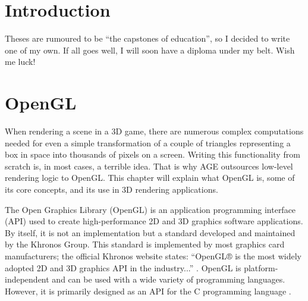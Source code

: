 \documentclass[
  digital,     %
  oneside,     %
  nosansbold,  %
  nocolorbold, %
  lof,         %
  lot,         %
]{fithesis4}
\begin{document}
\setlength{\parskip}{8pt}
\setlength{\parindent}{0pt}

\chapter*{Introduction}

Theses are rumoured to be \enquote{the capstones of education}, so
I decided to write one of my own. If all goes well, I will soon
have a diploma under my belt. Wish me luck!

\chapter{OpenGL}
When rendering a scene in a 3D game, there are numerous complex computations needed for even a simple transformation
of a couple of triangles representing a box in space into thousands of pixels on a screen.
Writing this functionality from scratch is, in most cases, a terrible idea. That is why AGE outsources low-level
rendering logic to OpenGL. This chapter will explain what OpenGL is, some of its core concepts,
and its use in 3D rendering applications.

The Open Graphics Library (OpenGL) is an application programming interface (API) used to create
high-performance 2D and 3D graphics software applications. By itself, it is not an implementation
but a standard developed and maintained by the Khronos Group. This standard is implemented by
most graphics card manufacturers; the official Khronos website states: \enquote{OpenGL® is the most widely
adopted 2D and 3D graphics API in the industry...} \cite{khronos}. OpenGL is platform-independent and can be
used with a wide variety of programming languages. However, it is primarily designed as an API for
the C programming language \cite{khronos}\cite{learnopengl}.
\end{document}
